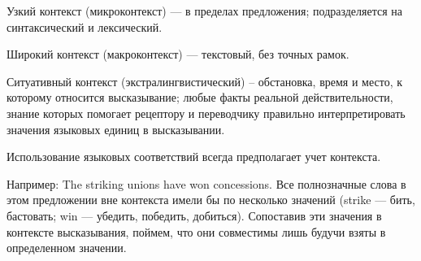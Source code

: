 Узкий контекст (микроконтекст) --- в пределах предложения; подразделяется на синтаксический и лексический.

Широкий контекст (макроконтекст) --- текстовый, без точных рамок.

Ситуативный контекст (экстралингвистический) -- обстановка, время и место, к которому относится высказывание; любые факты реальной действительности, знание которых помогает рецептору и переводчику правильно интерпретировать значения языковых единиц в высказывании.

Использование языковых соответствий всегда предполагает учет контекста.

Например: The striking unions have won concessions. Все полнозначные слова в этом предложении вне контекста имели бы по несколько значений (strike --- бить, бастовать; win --- убедить, победить, добиться). Сопоставив эти значения в контексте высказывания, поймем, что они  совместимы лишь будучи взяты в определенном значении.
